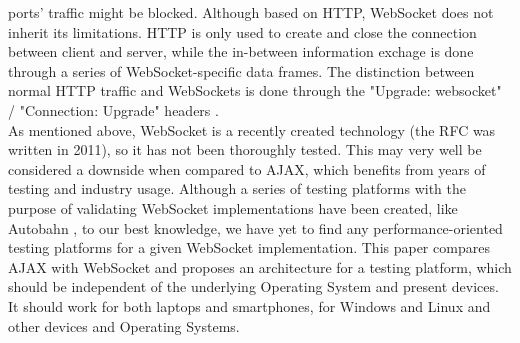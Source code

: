 \documentclass[conference]{IEEEtran}
\begin{document}
ports' traffic might be blocked. Although based on HTTP, WebSocket does not
inherit its limitations. HTTP is only used to create and close the connection
between client and server, while the in-between information exchage is done
through a series of WebSocket-specific data frames. The distinction between
normal HTTP traffic and WebSockets is done through the "Upgrade: websocket" /
"Connection: Upgrade" headers \cite{RFC}.
\\
\indent
As mentioned above, WebSocket is a recently created technology 
(the RFC was written in 2011), so it has not been thoroughly tested. This may
very well be considered a downside when compared to AJAX, which benefits from
years of testing and industry usage. Although a series of testing platforms
with the purpose of validating WebSocket implementations have been created,
like Autobahn \cite{Autobahn}, to our best knowledge, we have yet to find any
performance-oriented testing platforms for a given WebSocket implementation.
This paper compares AJAX with WebSocket and proposes an architecture for
a testing platform, which should be independent of the underlying Operating
System and present devices. It should work for both laptops and smartphones,
for Windows and Linux and other devices and Operating Systems.
\end{document}
